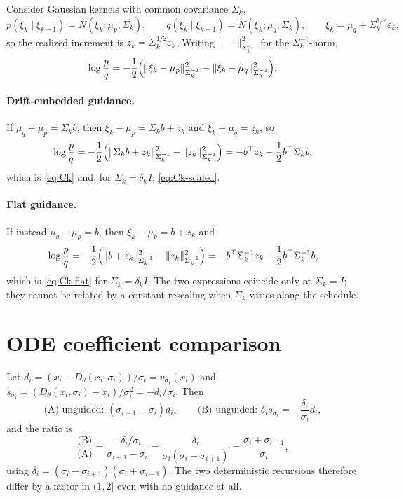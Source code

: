 \documentclass[11pt]{article}
\begin{document}
Consider Gaussian kernels with common covariance $\Sigma_k$,
\begin{equation}
  p(\xi_k\mid\xi_{k-1}) = N(\xi_k;\mu_p,\Sigma_k),
  \qquad
  q(\xi_k\mid\xi_{k-1}) = N(\xi_k;\mu_q,\Sigma_k),
  \qquad
  \xi_k = \mu_q + \Sigma_k^{1/2}\varepsilon_k ,
\end{equation}
so the realized increment is $z_k=\Sigma_k^{1/2}\varepsilon_k$. Writing
$\|\cdot\|_{\Sigma_k^{-1}}^2$ for the $\Sigma_k^{-1}$-norm,
\begin{equation}
  \log\frac{p}{q}
  = -\frac12\Bigl(\|\xi_k-\mu_p\|^2_{\Sigma_k^{-1}}
  - \|\xi_k-\mu_q\|^2_{\Sigma_k^{-1}}\Bigr).
\end{equation}
\paragraph{Drift-embedded guidance.} If $\mu_q-\mu_p=\Sigma_k b$, then
$\xi_k-\mu_p=\Sigma_k b+z_k$ and $\xi_k-\mu_q=z_k$, so
\begin{equation}
  \log\frac{p}{q}
  = -\frac12\Bigl(\|\Sigma_k b+z_k\|^2_{\Sigma_k^{-1}}-\|z_k\|^2_{\Sigma_k^{-1}}\Bigr)
  = -b^\top z_k-\frac12 b^\top\Sigma_k b,
\end{equation}
which is \eqref{eq:Ck} and, for $\Sigma_k=\delta_k I$, \eqref{eq:Ck-scaled}.
\paragraph{Flat guidance.} If instead $\mu_q-\mu_p=b$, then
$\xi_k-\mu_p=b+z_k$ and
\begin{equation}
  \log\frac{p}{q}
  = -\frac12\Bigl(\|b+z_k\|^2_{\Sigma_k^{-1}}-\|z_k\|^2_{\Sigma_k^{-1}}\Bigr)
  = -b^\top\Sigma_k^{-1}z_k-\frac12 b^\top\Sigma_k^{-1}b,
\end{equation}
which is \eqref{eq:Ck-flat} for $\Sigma_k=\delta_k I$. The two expressions coincide only at
$\Sigma_k=I$; they cannot be related by a constant rescaling when $\Sigma_k$ varies along the
schedule.

\section{ODE coefficient comparison}\label{app:ode}

Let $d_i=(x_i-D_\theta(x_i,\sigma_i))/\sigma_i=v_{\sigma_i}(x_i)$ and
$s_{\sigma_i}=(D_\theta(x_i,\sigma_i)-x_i)/\sigma_i^2=-d_i/\sigma_i$. Then
\begin{equation}
  \text{(A) unguided: } (\sigma_{i+1}-\sigma_i)d_i,
  \qquad
  \text{(B) unguided: } \delta_i s_{\sigma_i}
  = -\frac{\delta_i}{\sigma_i}d_i,
\end{equation}
and the ratio is
\begin{equation}
  \frac{\text{(B)}}{\text{(A)}} = \frac{-\delta_i/\sigma_i}{\sigma_{i+1}-\sigma_i}
  = \frac{\delta_i}{\sigma_i(\sigma_i-\sigma_{i+1})}
  = \frac{\sigma_i+\sigma_{i+1}}{\sigma_i},
\end{equation}
using $\delta_i=(\sigma_i-\sigma_{i+1})(\sigma_i+\sigma_{i+1})$. The two deterministic recursions
therefore differ by a factor in $(1,2]$ even with no guidance at all.



\end{document}
